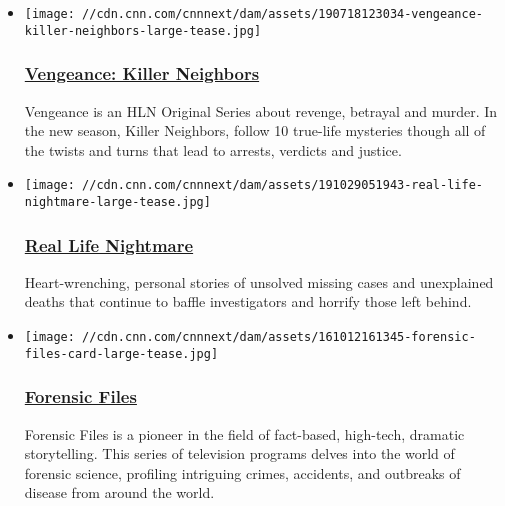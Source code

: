 \begin{itemize}
\item
  \href{https://www.cnncreativemarketing.com/project/vengeance/}{}

  \texttt{[image: //cdn.cnn.com/cnnnext/dam/assets/190718123034-vengeance-killer-neighbors-large-tease.jpg]}

  \hypertarget{vengeance-killer-neighbors}{%
  \subsubsection{\texorpdfstring{\href{https://www.cnncreativemarketing.com/project/vengeance/}{Vengeance:
  Killer
  Neighbors}}{Vengeance: Killer Neighbors}}\label{vengeance-killer-neighbors}}

  Vengeance is an HLN Original Series about revenge, betrayal and
  murder. In the new season, Killer Neighbors, follow 10 true-life
  mysteries though all of the twists and turns that lead to arrests,
  verdicts and justice.
\end{itemize}

\begin{itemize}
\item
  \href{https://www.cnncreativemarketing.com/project/real-life-nightmare/}{}

  \texttt{[image: //cdn.cnn.com/cnnnext/dam/assets/191029051943-real-life-nightmare-large-tease.jpg]}

  \hypertarget{real-life-nightmare}{%
  \subsubsection{\texorpdfstring{\href{https://www.cnncreativemarketing.com/project/real-life-nightmare/}{Real
  Life Nightmare}}{Real Life Nightmare}}\label{real-life-nightmare}}

  Heart-wrenching, personal stories of unsolved missing cases and
  unexplained deaths that continue to baffle investigators and horrify
  those left behind.
\end{itemize}

\begin{itemize}
\item
  \href{/shows/forensic-files}{}

  \texttt{[image: //cdn.cnn.com/cnnnext/dam/assets/161012161345-forensic-files-card-large-tease.jpg]}

  \hypertarget{forensic-files}{%
  \subsubsection{\texorpdfstring{\href{/shows/forensic-files}{Forensic
  Files}}{Forensic Files}}\label{forensic-files}}

  Forensic Files is a pioneer in the field of fact-based, high-tech,
  dramatic storytelling. This series of television programs delves into
  the world of forensic science, profiling intriguing crimes, accidents,
  and outbreaks of disease from around the world.
\end{itemize}

